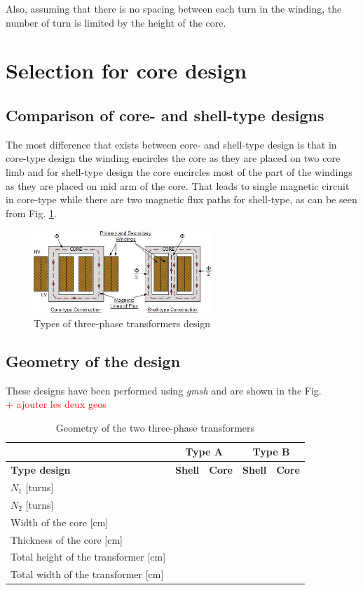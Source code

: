 \documentclass[12pt,a4paper]{report}
\begin{document}
Also, assuming that there is no spacing between each turn in the winding, the number of turn is limited by the height of the core.

\section{Selection for core design}
\subsection{Comparison of core- and shell-type designs}
The most difference that exists between core- and shell-type design is that in core-type design the winding encircles the core as they are placed on two core limb and for shell-type design the core encircles most of the part of the windings as they are placed on mid arm of the core. That leads to single magnetic circuit in core-type while there are two magnetic flux paths for shell-type, as can be seen from Fig. \ref{fig:shell_core_type}.

 \begin{figure}[h]
    \centering
    \includegraphics[width=0.6\textwidth]{type_design_2.jpg}
    \caption{Types of three-phase transformers design}
    \label{fig:shell_core_type}
\end{figure}


\subsection{Geometry of the design}
These designs have been performed using \textit{gmsh} and are shown in the Fig.\\
\textcolor{red}{+ ajouter les deux geos}

\begin{table}[h]
    \centering
\begin{tabular}{|l|l|l|l|l|}
  \hline
   & \multicolumn{2}{c|}{\textbf{Type A}} & \multicolumn{2}{c|}{\textbf{Type B}}\\\hline
   \textbf{Type design} & \textbf{Shell} & \textbf{Core} & \textbf{Shell} & \textbf{Core}\\\hline
   $N_1$ [turns]& & & &\\\hline
    $N_2$ [turns]& & & &\\\hline
    Width of the core [cm]& & & &\\\hline
    Thickness of the core [cm]& & & &\\\hline
    Total height of the transformer [cm]& & & &\\\hline
    Total width of the transformer [cm]& & & &\\
  \hline
\end{tabular}
    \caption{Geometry of the two three-phase transformers}
    \label{tab:designed_transfo}
\end{table}
\end{document}
